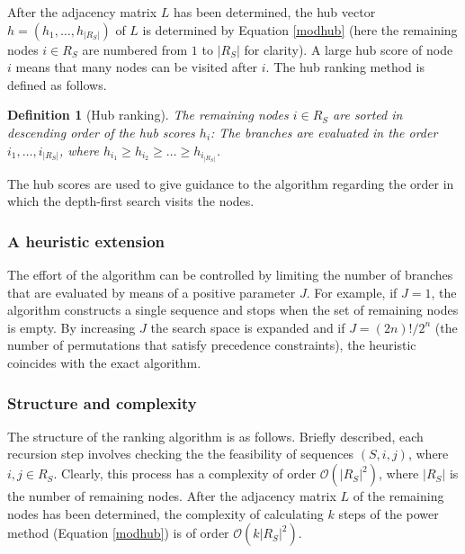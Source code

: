 \documentclass[dissertation,draft*]{aaltoseries}
\newtheorem*{definition}{Definition}
\begin{document}
After the adjacency matrix $L$ has been determined, the hub vector $h=(h_1,\ldots,h_{|R_S|})$ of $L$ is determined by 
Equation \eqref{modhub} (here the remaining nodes $i \in R_S$ are numbered from $1$ to $|R_S|$ for clarity). 
A large hub score of node $i$ means that many 
nodes can be visited after $i$. 
The hub ranking method is defined as follows.
\begin{definition}[Hub ranking]
The remaining nodes $i \in R_S$ are sorted in descending order of the hub scores $h_i$: 
The branches are evaluated in the order $i_1,\ldots,i_{|R_S|}$, where
$h_{i_1} \geq h_{i_2} \geq \ldots \geq h_{i_{|R_S|}}$.
\end{definition}

The hub scores are used to give guidance to the algorithm regarding the order in which the 
depth-first search visits the nodes. 

\subsubsection{A heuristic extension}
\label{rrheuristic}
The effort of the algorithm can be controlled by limiting the number of branches that are evaluated
by means of a positive parameter $J$. For example, if $J=1$, the algorithm constructs a single sequence
and stops when the set of remaining nodes is empty. By increasing $J$ the search space is expanded and
if $J = (2n)!/2^n$ (the number of permutations that satisfy precedence constraints), the heuristic
coincides with the exact algorithm.


\subsubsection{Structure and complexity}
\label{rrstructure}
The structure of the ranking algorithm is as follows. 
Briefly described, each recursion step involves checking the the feasibility
of sequences $(S,i,j)$, where $i,j \in R_S$.
Clearly, this process has a complexity of order $\mathcal{O} (|R_S|^2)$,
where $|R_S|$ is the number of remaining nodes. 
After the adjacency matrix $L$ of the remaining nodes has been determined, the complexity of 
calculating $k$ steps of the power method (Equation \eqref{modhub}) is of order $\mathcal{O} (k |R_S|^2)$.
\end{document}
